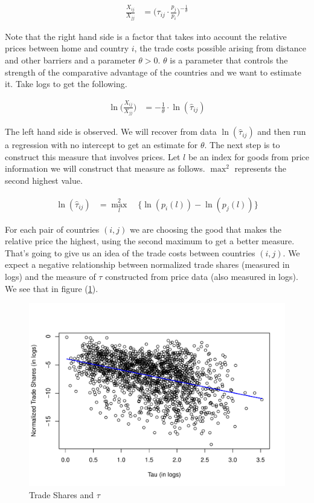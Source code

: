 \documentclass[a4paper,12pt]{article}
\begin{document}
 \begin{align*}
     \frac{X_{ij}}{X_{jj}} & = \bigg(\tau_{ij}\cdot \frac{p_j}{p_i}\bigg)^{-\frac{1}{\theta}}
 \end{align*}
 
 Note that the right hand side is a factor that takes into account the relative prices between home and country $i$, the trade costs possible arising from distance and other barriers and a parameter $\theta>0$. $\theta$ is a parameter that controls the strength of the comparative advantage of the countries and we want to estimate it. Take logs to get the following. 
 
 \begin{align}\label{baseline_regression_with_no_intercept}
     \ln\bigg(\frac{X_{ij}}{X_{jj}}\bigg) & = -\frac{1}{\theta} \cdot \ln (\hat{\tau}_{ij}) 
 \end{align}
 
 The left hand side is observed. We will recover from data $\ln(\hat{\tau}_{ij})$ and then run a regression with no intercept to get an estimate for $\theta$. The next step is to construct this measure that involves prices. Let $l$ be an index for goods from price information we will construct that measure as follows. $\max^2$ represents the second highest value. 
 
 \begin{align*}
     \ln(\hat{\tau}_{ij}) & = \max_{l}^2 \quad \{\ln(p_i(l)) - \ln(p_j(l))\}
 \end{align*}
 
 For each pair of countries $(i,j)$ we are choosing the good that makes the relative price the highest, using the second maximum to get a better measure. That's going to give us an idea of the trade costs between countries $(i,j)$. We expect a negative relationship between normalized trade shares (measured in logs) and the measure of $\tau$ constructed from price data (also measured in logs). We see that in figure (\ref{trade_shares_and_tau}). 
 
   \begin{figure}[htbp!]
     \centering
     \includegraphics[scale=0.75]{trade_shares_and_tau.pdf}
     \caption{Trade Shares and $\tau$}
     \label{trade_shares_and_tau}
 \end{figure}
 
\end{document}
